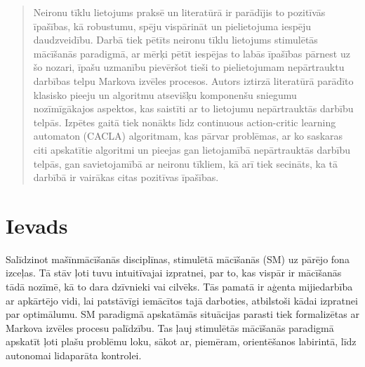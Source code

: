 \documentclass[a0,landscape]{a0poster}
\numberwithin{equation}{section}
\theoremstyle{definition}
\theoremstyle{plain}
\begin{document}
\begin{multicols}{4} %


\color{Navy} %

\begin{abstract}

Neironu tīklu lietojums praksē un literatūrā ir parādījis to pozitīvās īpašības, kā robustumu, spēju vispārināt un pielietojuma iespēju daudzveidību.
Darbā tiek pētīts neironu tīklu lietojums stimulētās mācīšanās paradigmā, ar mērķi pētīt iespējas to labās īpašības pārnest uz šo nozari, īpašu uzmanību pievēršot tieši to pielietojumam nepārtrauktu darbības telpu Markova izvēles procesos.
Autors iztirzā literatūrā parādīto klasisko pieeju un algoritmu atsevišķu komponenšu sniegumu nozīmīgākajos aspektos, kas saistīti ar to lietojumu nepārtrauktās darbību telpās.
Izpētes gaitā tiek nonākts līdz continuous action-critic learning automaton (CACLA) algoritmam, kas pārvar problēmas, ar ko saskaras citi apskatītie algoritmi un pieejas gan lietojamībā nepārtrauktās darbību telpās, gan savietojamībā ar neironu tīkliem, kā arī tiek secināts, ka tā darbībā ir vairākas citas pozitīvas īpašības.

\end{abstract}


\color{SaddleBrown} %

\section*{Ievads}

Salīdzinot mašīnmācīšanās disciplīnas, stimulētā mācīšanās (SM) uz pārējo fona izceļas.
Tā stāv ļoti tuvu intuitīvajai izpratnei, par to, kas vispār ir mācīšanās tādā nozīmē, kā to dara dzīvnieki vai cilvēks.
Tās pamatā ir aģenta mijiedarbība ar apkārtējo vidi, lai patstāvīgi iemācītos tajā darboties, atbilstoši kādai izpratnei par optimālumu.
SM paradigmā apskatāmās situācijas parasti tiek formalizētas ar Markova izvēles procesu palīdzību.
Tas ļauj stimulētās mācīšanās paradigmā apskatīt ļoti plašu problēmu loku, sākot ar, piemēram, orientēšanos labirintā, līdz autonomai lidaparāta kontrolei.


\end{multicols}
\end{document}
